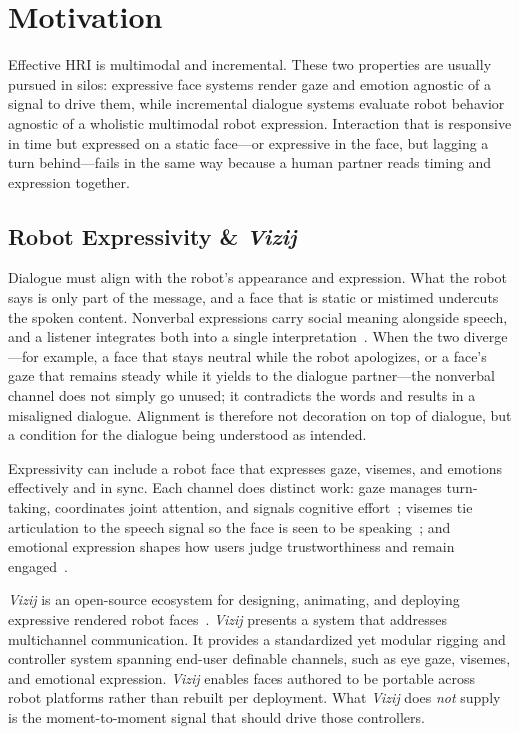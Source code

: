\documentclass[conference]{IEEEtran}
\begin{document}
\section{Motivation}
Effective HRI is multimodal and incremental. These two properties are usually pursued in silos: expressive face systems render gaze and emotion agnostic of a signal to drive them, while incremental dialogue systems evaluate robot behavior agnostic of a wholistic multimodal robot expression. Interaction that is responsive in time but expressed on a static face---or expressive in the face, but lagging a turn behind---fails in the same way because a human partner reads timing and expression together.



\subsection{Robot Expressivity \& \textit{Vizij}}
Dialogue must align with the robot's appearance and expression. What the robot says is only part of the message, and a face that is static or mistimed undercuts the spoken content. Nonverbal expressions carry social meaning alongside speech, and a listener integrates both into a single interpretation~\cite{urakami2023nonverbal, admoni2017social}. When the two diverge---for example, a face that stays neutral while the robot apologizes, or a face's gaze that remains steady while it yields to the dialogue partner---the nonverbal channel does not simply go unused; it contradicts the words and results in a misaligned dialogue. Alignment is therefore not decoration on top of dialogue, but a condition for the dialogue being understood as intended.

Expressivity can include a robot face that expresses gaze, visemes, and emotions effectively and in sync. Each channel does distinct work: gaze manages turn-taking, coordinates joint attention, and signals cognitive effort~\cite{mishra2023gaze}; visemes tie articulation to the speech signal so the face is seen to be speaking~\cite{edwards2016jali}; and emotional expression shapes how users judge trustworthiness and remain engaged~\cite{song2023robot}.

\textit{Vizij} is an open-source ecosystem for designing, animating, and deploying expressive rendered robot faces~\cite{elbeleidy2026vizij}. \textit{Vizij} presents a system that addresses multichannel communication. It provides a standardized yet modular rigging and controller system spanning end-user definable channels, such as eye gaze, visemes, and emotional expression. \textit{Vizij} enables faces authored to be portable across robot platforms rather than rebuilt per deployment. What \textit{Vizij} does \textit{not} supply is the moment-to-moment signal that should drive those controllers.
\end{document}
